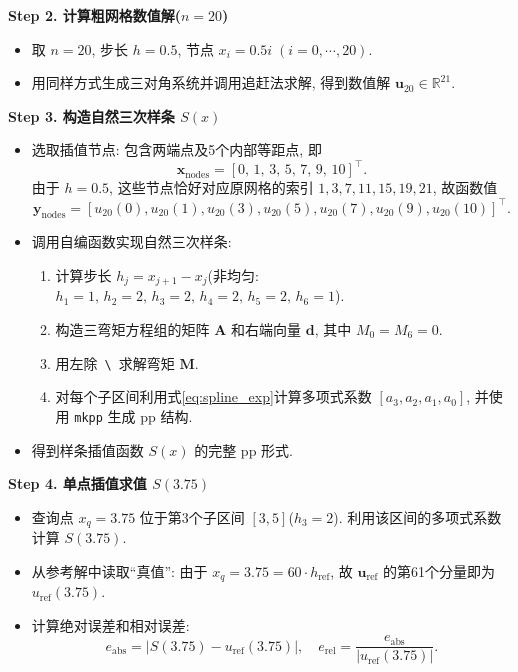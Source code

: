 \documentclass[zihao=-4,a4paper]{ctexart}
\begin{document}
\textbf{Step 2. 计算粗网格数值解($n=20$)}
\begin{itemize}
    \item 取 $n=20$, 步长 $h=0.5$, 节点 $x_i = 0.5i\;(i=0,\cdots,20)$. 
    \item 用同样方式生成三对角系统并调用追赶法求解, 得到数值解 $\bm{u}_{20}\in\mathbb{R}^{21}$. 
\end{itemize}

\textbf{Step 3. 构造自然三次样条 $S(x)$}
\begin{itemize}
    \item 选取插值节点: 包含两端点及5个内部等距点, 即
    \[
        \bm{x}_{\text{nodes}} = [0,\,1,\,3,\,5,\,7,\,9,\,10]^\top.
    \]
    由于 $h=0.5$, 这些节点恰好对应原网格的索引 $1,3,7,11,15,19,21$, 故函数值
    \[
        \bm{y}_{\text{nodes}} = [u_{20}(0), u_{20}(1), u_{20}(3), u_{20}(5), u_{20}(7), u_{20}(9), u_{20}(10)]^\top.
    \]
    \item 调用自编函数实现自然三次样条: 
    \begin{enumerate}[label=\arabic*.]
        \item 计算步长 $h_j = x_{j+1} - x_j$(非均匀: $h_1=1,\,h_2=2,\,h_3=2,\,h_4=2,\,h_5=2,\,h_6=1$). 
        \item 构造三弯矩方程组的矩阵 $\bm{A}$ 和右端向量 $\bm{d}$, 其中 $M_0=M_6=0$. 
        \item 用左除\ \texttt{\textbackslash}\ 求解弯矩 $\bm{M}$. 
        \item 对每个子区间利用式\eqref{eq:spline_exp}计算多项式系数 $[a_3, a_2, a_1, a_0]$, 并使用 \texttt{mkpp} 生成 pp 结构. 
    \end{enumerate}
    \item 得到样条插值函数 $S(x)$ 的完整 pp 形式. 
\end{itemize}

\textbf{Step 4. 单点插值求值 $S(3.75)$}
\begin{itemize}[rightmargin=0.5cm]
    \item 查询点 $x_q = 3.75$ 位于第3个子区间 $[3,5]$($h_3=2$). 利用该区间的多项式系数计算 $S(3.75)$. 
    \item 从参考解中读取“真值”: 由于 $x_q = 3.75 = 60 \cdot h_{\text{ref}}$, 故 $\bm{u}_{\text{ref}}$ 的第61个分量即为 $u_{\text{ref}}(3.75)$. 
    \item 计算绝对误差和相对误差: 
    \[
        e_{\text{abs}} = |S(3.75) - u_{\text{ref}}(3.75)|,\quad
        e_{\text{rel}} = \frac{e_{\text{abs}}}{|u_{\text{ref}}(3.75)|}.
    \]
\end{itemize}
\end{document}
